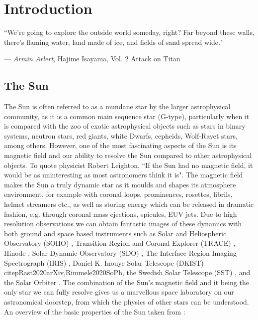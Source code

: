 \chapter{Introduction}
\label{chap:intro}
\epigraph{``We're going to explore the outside world someday, right? Far beyond these walls, there's flaming water, land made of ice, and fields of sand spread wide."}{--- \textit{Armin Arlert}, \textup{Hajime Isayama}, Vol. 2  Attack on Titan}
\section{The Sun}
\label{sec:Sun}
The Sun is often referred to as a mundane star by the larger astrophysical community, as it is a common main sequence star (G-type), particularly when it is compared with the zoo of exotic astrophysical objects such as stars in binary systems, neutron stars, red giants, white Dwarfs, cepheids, Wolf-Rayet stars, among others. However, one of the most fascinating aspects of the Sun is its magnetic field and our ability to resolve the Sun compared to other astrophysical objects. To quote physicist Robert Leighton, ``If the Sun had no magnetic field, it would be as uninteresting as most astronomers think it is". The magnetic field makes the Sun a truly dynamic star as it moulds and shapes its atmosphere environment, for example with coronal loops, prominences, rosettes, fibrils, helmet streamers etc., as well as storing energy which can be released in dramatic fashion, e.g. through coronal mass ejections, spicules, EUV jets. Due to high resolution observations we can obtain fantastic images of these dynamics with both ground and space based instruments such as Solar and Heliospheric Observatory (SOHO) \citep{Domingo1995SSRv7281D}, Transition Region and Coronal Explorer (TRACE) \citep{Tarbell1994ESASP373375T}, Hinode \citep{Tsuneta2008SoPh,Suematsu2008SoPh,Ichimoto2008SoPh}, Solar Dynamic Observatory (SDO) \citep{Lemen2012SoPh27517L}, The Interface Region Imaging Spectrograph (IRIS) \citep{Pontieu2013SPD4403D}, Daniel K. Inouye Solar Telescope (DKIST) \\citep{Rast2020arXiv,Rimmele2020SoPh}, the Swedish Solar Telescope (SST) \citep{Scharmer2003SPIE}, and the Solar Orbiter \citep{sol_orb_2013SPIE8862E0EM}. The combination of the Sun's magnetic field and it being the only star we can fully resolve gives us a marvellous space laboratory on our astronomical doorstep, from which the physics of other stars can be understood. An overview of the basic properties of the Sun taken from \cite{priest2014magnetohydrodynamics}:
